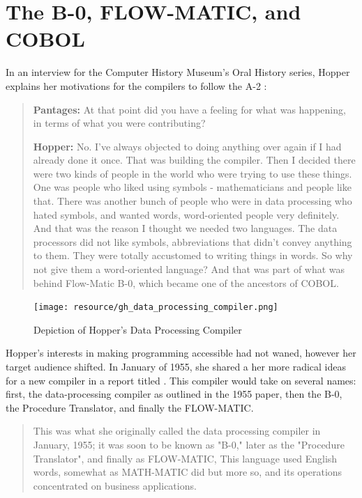 \section{The B-0, FLOW-MATIC, and COBOL}

In an interview for the Computer History Museum's Oral History series,
Hopper explains her motivations for the compilers to follow the A-2
\cite{Hopper_1980_Oral_History}:

\begin{quotation}
  \textbf{Pantages:} At that point did you have a feeling for what was 
happening, in terms of what you were contributing?

  \textbf{Hopper:} No. I've always objected to doing anything over again if I had 
already done it once. That was building the compiler. Then I decided there were 
two kinds of people in the world who were trying to use these things. One was 
people who liked using symbols - mathematicians and people like that. There was 
another bunch of people who were in data processing who hated symbols, and 
wanted words, word-oriented people very definitely. And that was the reason I 
thought we needed two languages.  The data processors did not like symbols, 
abbreviations that didn't convey anything to them.  They were totally 
accustomed to writing things in words. So why not give them a word-oriented 
language? And that was part of what was behind Flow-Matic B-0, which became one 
of the ancestors of COBOL.
\end{quotation}

\begin{figure}
    \centering
    \texttt{[image: resource/gh\_data\_processing\_compiler.png]}
    \caption{Depiction of Hopper's Data Processing Compiler\cite{hopper_1955_preliminary_definitions_data_processing_compiler}}
    \label{fig:data-processing-compiler}
\end{figure}

Hopper's interests in making programming accessible had not waned,
however her target audience shifted.
In January of 1955, she shared a her more radical ideas for a new
compiler in a report titled
\cite{hopper_1955_preliminary_definitions_data_processing_compiler}
.
This compiler would take on several names: first, the data-processing
compiler as outlined in the 1955 paper, then the B-0, the Procedure Translator,
and finally the FLOW-MATIC.

\begin{quotation}
  This was what she originally called the data processing compiler in January,
  1955; it was soon to be known as "B-0," later as the "Procedure
  Translator", and finally as FLOW-MATIC, This language used English
  words, somewhat as MATH-MATIC did but more so, and its operations concentrated
  on business applications.
  \cite{history_of_computing_in_the_twentieth_century_1980}
\end{quotation}


